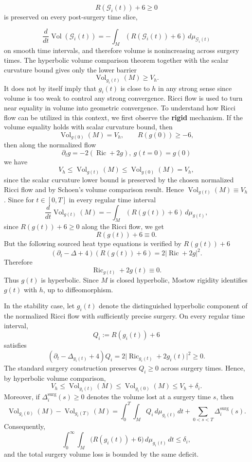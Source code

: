 \documentclass{amsart}
\begin{document}
\[
        R(\mathcal G_i(t))+6\geq0
\]
is preserved on every post-surgery time slice,

\[
        \frac{d}{dt}\operatorname{Vol}(\mathcal G_i(t))
        =
        -\int_{M} (R(\mathcal G_i(t))+6)\,d\mu_{\mathcal G_i(t)}
\]
on smooth time intervals, and therefore volume is nonincreasing across surgery times. The
hyperbolic volume comparison theorem together with the scalar curvature bound gives only the lower barrier
\[
        \operatorname{Vol}_{g_i(t)}(M)\geq V_h .
\]
It does not by itself imply that \(g_i(t)\) is close to \(h\) in any strong sense since volume is too weak to control any strong convergence.  Ricci flow is
used to turn near equality in volume into geometric convergence. To understand how Ricci flow can be utilized in this context, we first observe the \textbf{rigid} mechanism.  If the volume equality holds with scalar curvature bound, then
\[
        \operatorname{Vol}_{g(0)}(M)=V_h,
        \qquad
        R(g(0))\geq -6,
\]
then along the normalized flow
\[
        \partial_t g=-2(\operatorname{Ric}+2g),~g(t=0)=g(0)
\]
we have
\[
        V_h\leq \operatorname{Vol}_{g(t)}(M)\leq \operatorname{Vol}_{g(0)}(M)=V_h,
\]
since the scalar curvature lower bound is preserved by the chosen normalized Ricci flow and by Schoen's volume comparison result.
Hence \(\operatorname{Vol}_{g(t)}(M)\equiv V_h\).  Since for $t\in [0,T]$ in every regular time interval
\[
        \frac{d}{dt}\operatorname{Vol}_{g(t)}(M)
        =
        -\int_M (R(g(t))+6)\,d\mu_{g(t)},
\]
since $R(g(t))+6\geq 0$ along the Ricci flow, we get
\[
        R(g(t))+6\equiv0.
\]
But the following sourced heat type equations is verified by $R(g(t))+6$
\[
        (\partial_t-\Delta+4)(R(g(t))+6)
        =
        2|\operatorname{Ric}+2g|^2.
\]
Therefore
\[
        \operatorname{Ric}_{g(t)}+2g(t)\equiv0.
\]
Thus \(g(t)\) is hyperbolic. Since \(M\) is closed hyperbolic, Mostow
rigidity identifies \(g(t)\) with \(h\), up to diffeomorphism.

\noindent In the stability case, let \(g_i(t)\) denote the distinguished
hyperbolic component of the normalized Ricci flow with sufficiently
precise surgery. On every regular time interval,
\[
Q_i:=R(g_i(t))+6
\]
satisfies
\[
(\partial_t-\Delta_{g_i(t)}+4)Q_i
=
2\bigl|\operatorname{Ric}_{g_i(t)}+2g_i(t)\bigr|^2
\geq0.
\]
The standard surgery construction preserves \(Q_i\geq0\) across surgery
times. Hence, by hyperbolic volume comparison,
\[
V_h\leq \operatorname{Vol}_{g_i(t)}(M)\leq
\operatorname{Vol}_{g_i(0)}(M)\leq V_h+\delta_i.
\]
Moreover, if \(\Delta_i^{\mathrm{surg}}(s)\geq0\) denotes the volume
lost at a surgery time \(s\), then
\[
\operatorname{Vol}_{g_i(0)}(M)-\operatorname{Vol}_{g_i(T)}(M)
=
\int_0^T\int_M Q_i\,d\mu_{g_i(t)}\,dt
+
\sum_{0<s<T}\Delta_i^{\mathrm{surg}}(s).
\]
Consequently,
\begin{equation}
\label{eq:Qspacetime}
\int_0^\infty\int_M
\bigl(R(g_i(t))+6\bigr)\,d\mu_{g_i(t)}\,dt
\leq \delta_i,
\end{equation}
and the total surgery volume loss is bounded by the same deficit.
\end{document}
